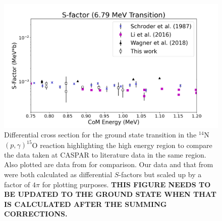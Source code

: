\begin{figure}
		\includegraphics[width=1.0\linewidth]{figures/highCompare679.png}
	\caption{Differential cross section for the ground state transition in the $^{14}$N$\left( p,\gamma \right) ^{15}$O reaction highlighting the high energy region to compare the data taken at CASPAR to literature data in the same region. Also plotted are data from \cite{Schroder1987, Li2016, Wagner2018} for comparison. Our data and that from \citet{Li2016} were both calculated as differential $S$-factors but scaled up by a factor of $4\pi$ for plotting purposes.  \textbf{THIS FIGURE NEEDS TO BE UPDATED TO THE GROUND STATE WHEN THAT IS CALCULATED AFTER THE SUMMING CORRECTIONS.} }
	\label{fig: highCompareGS}
\end{figure}




